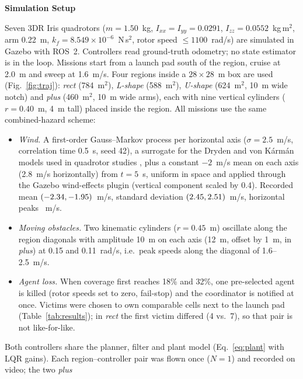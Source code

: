 \documentclass[10pt,letterpaper]{article}
\newif\ifafterheadone
\newcommand{\headingtwo}[1]{\par\ifafterheadone\nopagebreak\else\addpenalty{-200}\fi\vspace{6pt}%
    {\centering\fontsize{12}{14}\selectfont\bfseries #1\par}%
    \nopagebreak\vspace{2pt}\nopagebreak\global\afterheadonefalse\noindent\ignorespaces}
\begin{document}
\headingtwo{Simulation Setup}
Seven 3DR Iris quadrotors ($m=1.50$~kg, $I_{xx}=I_{yy}=0.0291$, $I_{zz}=0.0552$~kg\,m$^2$, arm
0.22~m, $k_f=8.549\times10^{-6}$~N\,s$^2$, rotor speed $\le1100$~rad/s) are simulated in Gazebo
\cite{koenigGazebo2004} with ROS~2. Controllers read ground-truth odometry; no state estimator
is in the loop. Missions start from a launch pad south of the region, cruise at 2.0~m and sweep
at 1.6~m/s. Four regions inside a $28\times28$~m box are used (Fig.~\ref{fig:traj}): \emph{rect}
(784~m$^2$), \emph{L-shape} (588~m$^2$), \emph{U-shape} (624~m$^2$, 10~m wide notch) and
\emph{plus} (460~m$^2$, 10~m wide arms), each with nine vertical cylinders ($r=0.40$~m, 4~m
tall) placed inside the region. All missions use the same combined-hazard scheme:
\begin{itemize}[leftmargin=1.2em,itemsep=0pt,topsep=1pt,parsep=0pt]
\item \emph{Wind.} A first-order Gauss--Markov process per horizontal axis ($\sigma=2.5$~m/s,
      correlation time 0.5~s, seed 42), a surrogate for the Dryden and von K\'arm\'an
      models used in quadrotor studies \cite{mirandaMoyaTurbulentWind2023}, plus a constant $-2$~m/s mean on each
      axis (2.8~m/s horizontally) from $t=5$~s, uniform in space and applied through the Gazebo wind-effects plugin
      (vertical component scaled by 0.4). Recorded mean $(-2.34,-1.95)$~m/s, standard
      deviation $(2.45,2.51)$~m/s, horizontal peaks \WindMaxH~m/s.
\item \emph{Moving obstacles.} Two kinematic cylinders ($r=0.45$~m) oscillate along the region
      diagonals with amplitude 10~m on each axis (12~m, offset by 1~m, in \emph{plus}) at 0.15 and
      0.11~rad/s, i.e.\ peak speeds along the diagonal of 1.6--2.5~m/s.
\item \emph{Agent loss.} When coverage first reaches 18\% and 32\%, one pre-selected agent is
      killed (rotor speeds set to zero, fail-stop) and the coordinator is notified at once.
      Victims were chosen to own comparable cells next to the launch pad (Table~\ref{tab:results});
      in \emph{rect} the first victim differed (4 vs.\ 7), so that pair is not like-for-like.
\end{itemize}
Both controllers share the planner, filter and plant model (Eq.~\eqref{eq:plant} with LQR gains).
Each region--controller pair was flown once ($N=1$) and recorded on video; the two \emph{plus}
\end{document}
